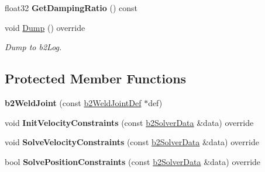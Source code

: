 \begin{DoxyCompactItemize}
\mbox{\label{classb2WeldJoint_a603d83491d474156b2c09b59a23bfca4}} 
float32 {\bfseries Get\+Damping\+Ratio} () const
\item 
\mbox{\label{classb2WeldJoint_a59de1cad3229b41886bc23c4d6216e2f}} 
void \mbox{\hyperlink{classb2WeldJoint_a59de1cad3229b41886bc23c4d6216e2f}{Dump}} () override
\begin{DoxyCompactList}\small\item\em Dump to b2\+Log. \end{DoxyCompactList}\end{DoxyCompactItemize}
\subsection*{Protected Member Functions}
\begin{DoxyCompactItemize}
\item 
\mbox{\label{classb2WeldJoint_a84dbb52e983d9039eab6ad64ae62d8eb}} 
{\bfseries b2\+Weld\+Joint} (const \mbox{\hyperlink{structb2WeldJointDef}{b2\+Weld\+Joint\+Def}} $\ast$def)
\item 
\mbox{\label{classb2WeldJoint_afb54f848fe19f33555f01594e3e4f410}} 
void {\bfseries Init\+Velocity\+Constraints} (const \mbox{\hyperlink{structb2SolverData}{b2\+Solver\+Data}} \&data) override
\item 
\mbox{\label{classb2WeldJoint_a0367580735b117dcf9a4292df4daf883}} 
void {\bfseries Solve\+Velocity\+Constraints} (const \mbox{\hyperlink{structb2SolverData}{b2\+Solver\+Data}} \&data) override
\item 
\mbox{\label{classb2WeldJoint_a068ae45ce6577e27669121032c277015}} 
bool {\bfseries Solve\+Position\+Constraints} (const \mbox{\hyperlink{structb2SolverData}{b2\+Solver\+Data}} \&data) override
\end{DoxyCompactItemize}
